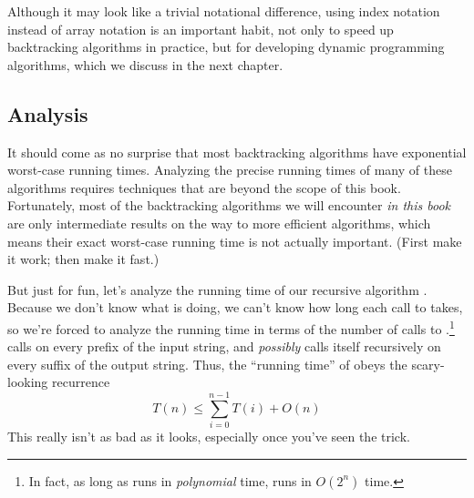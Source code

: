Although it may look like a trivial notational difference, using index notation instead of array notation is an important habit, not only to speed up backtracking algorithms in practice, but for developing dynamic programming algorithms, which we discuss in the next chapter.

\subsection{Analysis}

It should come as no surprise that most backtracking algorithms have exponential worst-case running times.
Analyzing the precise running times of many of these algorithms requires techniques that are beyond the scope of this book.
Fortunately, most of the backtracking algorithms we will encounter \textit{in this book} are only intermediate results on the way to more efficient algorithms, which means their exact worst-case running time is not actually important.
(First make it work; then make it fast.)

But just for fun, let’s analyze the running time of our recursive algorithm .
Because we don’t know what  is doing, we can’t know how long each call to  takes, so we’re forced to analyze the running time in terms of the number of calls to .\footnote{In fact, as long as  runs in \textit{polynomial} time,  runs in $O(2^n)$ time.}
 calls  on every prefix of the input string, and \textit{possibly} calls itself recursively on every suffix of the output string.
Thus, the “running time” of  obeys the scary-looking recurrence
\[
T(n) \le \sum_{i=0}^{n-1} T(i) + O(n)
\]
This really isn’t as bad as it looks, especially once you’ve seen the trick.

